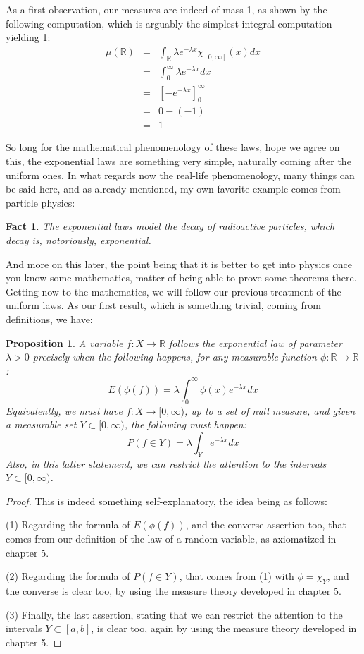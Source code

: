 \documentclass[12pt]{amsbook}
\newtheorem{fact}[theorem]{Fact}
\newtheorem{proposition}[theorem]{Proposition}
\begin{document}
As a first observation, our measures are indeed of mass 1, as shown by the following computation, which is arguably the simplest integral computation yielding 1:
\begin{eqnarray*}
\mu(\mathbb R)
&=&\int_\mathbb R\lambda e^{-\lambda x}\chi_{[0,\infty]}(x)dx\\
&=&\int_0^\infty \lambda e^{-\lambda x}dx\\
&=&\left[-e^{-\lambda x}\right]_0^\infty\\
&=&0-(-1)\\
&=&1
\end{eqnarray*}

So long for the mathematical phenomenology of these laws, hope we agree on this, the exponential laws are something very simple, naturally coming after the uniform ones. In what regards now the real-life phenomenology, many things can be said here, and as already mentioned, my own favorite example comes from particle physics:

\begin{fact}
The exponential laws model the decay of radioactive particles, which decay is, notoriously, exponential.
\end{fact}

And more on this later, the point being that it is better to get into physics once you know some mathematics, matter of being able to prove some theorems there. Getting now to the mathematics, we will follow our previous treatment of the uniform laws. As our first result, which is something trivial, coming from definitions, we have:

\begin{proposition}
A variable $f:X\to\mathbb R$ follows the exponential law of parameter $\lambda>0$ precisely when the following happens, for any measurable function $\phi:\mathbb R\to\mathbb R$:
$$E(\phi(f))=\lambda\int_0^\infty\phi(x)e^{-\lambda x}dx$$
Equivalently, we must have $f:X\to[0,\infty)$, up to a set of null measure, and given a measurable set $Y\subset[0,\infty)$, the following must happen:
$$P(f\in Y)=\lambda\int_Ye^{-\lambda x}dx$$
Also, in this latter statement, we can restrict the attention to the intervals $Y\subset[0,\infty)$.
\end{proposition}

\begin{proof}
This is indeed something self-explanatory, the idea being as follows:

\medskip

(1) Regarding the formula of $E(\phi(f))$, and the converse assertion too, that comes from our definition of the law of a random variable, as axiomatized in chapter 5.

\medskip

(2) Regarding the formula of $P(f\in Y)$, that comes from (1) with $\phi=\chi_Y$, and the converse is clear too, by using the measure theory developed in chapter 5.

\medskip

(3) Finally, the last assertion, stating that we can restrict the attention to the intervals $Y\subset[a,b]$, is clear too, again by using the measure theory developed in chapter 5.
\end{proof}
\end{document}
